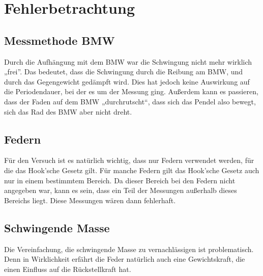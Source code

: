 \chapter{Fehlerbetrachtung}
\section{Messmethode BMW}
Durch die Aufhängung mit dem BMW war die Schwingung nicht mehr wirklich „frei”. Das bedeutet, dass die Schwingung durch die Reibung am BMW, und durch das Gegengewicht gedämpft wird. Dies hat jedoch keine Auswirkung auf die Periodendauer, bei der es um der Messung ging. Außerdem kann es passieren, dass der Faden auf dem BMW „durchrutscht“, dass sich das Pendel also bewegt, sich das Rad des BMW aber nicht dreht.

\section{Federn}
Für den Versuch ist es natürlich wichtig, dass nur Federn verwendet werden, für die das Hook'sche Gesetz gilt. Für manche Federn gilt das Hook'sche Gesetz auch nur in einem bestimmtem Bereich. Da dieser Bereich bei den Federn nicht angegeben war, kann es sein, dass ein Teil der Messungen außerhalb dieses Bereichs liegt. Diese Messungen wären dann fehlerhaft.

\section{Schwingende Masse}
Die Vereinfachung, die schwingende Masse zu vernachlässigen ist problematisch.
Denn in Wirklichkeit erfährt die Feder natürlich auch eine Gewichtskraft, die einen Einfluss auf die Rückstellkraft hat.